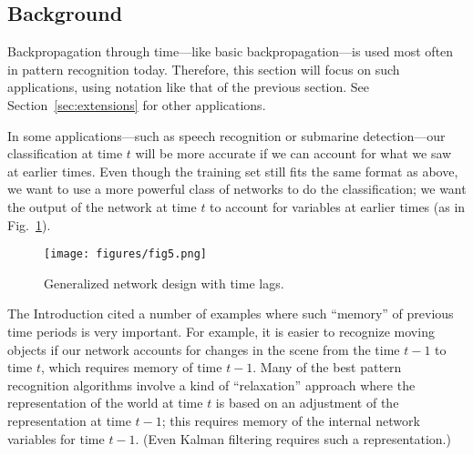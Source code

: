 \documentclass[journal]{IEEEtran} %
\begin{document}
\subsection{Background}
Backpropagation through time---like basic backpropagation---is used most often in pattern recognition today. Therefore, this section will focus on such applications, using notation like that of the previous section. See Section~\ref{sec:extensions} for other applications.

In some applications---such as speech recognition or submarine detection---our classification at time $t$ will be more accurate if we can account for what we saw at earlier times. Even though the training set still fits the same format as above, we want to use a more powerful class of networks to do the classification; we want the output of the network at time $t$ to account for variables at earlier times (as in Fig.~\ref{fig:network_design_time_lags}).

\begin{figure}[htb]
    \centering
    \texttt{[image: figures/fig5.png]} %
    \caption{Generalized network design with time lags.}
    \label{fig:network_design_time_lags}
\end{figure}

The Introduction cited a number of examples where such ``memory'' of previous time periods is very important. For example, it is easier to recognize moving objects if our network accounts for changes in the scene from the time $t-1$ to time $t$, which requires memory of time $t-1$. Many of the best pattern recognition algorithms involve a kind of ``relaxation'' approach where the representation of the world at time $t$ is based on an adjustment of the representation at time $t-1$; this requires memory of the internal network variables for time $t-1$. (Even Kalman filtering requires such a representation.)
\end{document}
